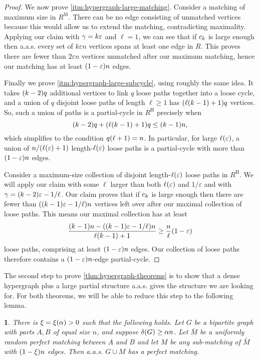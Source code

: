 \documentclass[11pt,english]{article}
\theoremstyle{plain}
\theoremstyle{definition}
\theoremstyle{definition}
\theoremstyle{plain}
\theoremstyle{plain}
\theoremstyle{plain}
\newtheorem{lem}[thm]{\protect\lemmaname}
\theoremstyle{plain}
\theoremstyle{remark}
\theoremstyle{remark}
\let\originalleft\left
\let\originalright\right
\renewcommand{\left}{\mathopen{}\mathclose\bgroup\originalleft}
\renewcommand{\right}{\aftergroup\egroup\originalright}
\providecommand{\lemmaname}{Lemma}
\begin{document}
\begin{proof}
We now prove \ref{itm:hypergraph-large-matching}. Consider a matching of maximum size in $R^{\mathrm{M}}$.
There can be no edge consisting of unmatched vertices because this would
allow us to extend the matching, contradicting maximality. Applying
our claim with $\gamma=k\varepsilon$ and $\ell=1$, we can see that
if $c_{k}$ is large enough then
a.a.s. every set of $k\varepsilon n$ vertices spans at least one
edge in $R$. This proves there are fewer than \emph{$2\varepsilon n$}
vertices unmatched after our maximum matching, hence our matching
has at least $\left(1-\varepsilon\right)n$ edges.

Finally we prove \ref{itm:hypergraph-large-subcycle}, using roughly the same idea. It takes $\left(k-2\right)q$ additional
vertices to link $q$ loose paths together into a loose cycle, and
a union of $q$ disjoint loose paths of length $\ell\ge1$ has $\left(\ell\left(k-1\right)+1\right)q$
vertices. So, such a union of paths is a partial-cycle in $R^{\mathrm{H}}$
precisely when 
\[
\left(k-2\right)q+\left(\ell\left(k-1\right)+1\right)q\le\left(k-1\right)n,
\]
which simplifies to the condition $q\left(\ell+1\right)=n$. In particular,
for large $\ell\left(\varepsilon\right)$, a union of $n/\left(\ell\left(\varepsilon\right)+1\right)$
length-$\ell\left(\varepsilon\right)$ loose paths is a partial-cycle
with more than $\left(1-\varepsilon\right)n$ edges.

Consider a maximum-size collection of disjoint length-$\ell\left(\varepsilon\right)$
loose paths in $R^{\mathrm{H}}$. We will apply our claim with some $\ell$ larger than both $\ell\left(\varepsilon\right)$ and $1/\varepsilon$ and with $\patheps=\left(k-2\right)\varepsilon-1/\ell$. Our claim proves that if $c_{k}$ is large enough then there are fewer than $\left(\left(k-1\right)\varepsilon-1/\ell\right)n$ vertices left over after our maximal collection of loose paths. This means our maximal collection has at least
\[
\frac{\left(k-1\right)n-\left(\left(k-1\right)\varepsilon-1/\ell\right)n}{\ell\left(k-1\right)+1}\ge\frac{n}{\ell}\left(1-\varepsilon\right)
\]
loose paths, comprising at least $\left(1-\varepsilon\right)n$
edges. Our collection of loose paths therefore contains a $\left(1-\varepsilon\right)n$-edge partial-cycle.
\end{proof}
The second step to prove \ref{thm:hypergraph-theorems} is to show that a dense
hypergraph plus a large partial structure a.a.s. gives the structure
we are looking for. For both theorems, we will be able to reduce this
step to the following lemma.
\begin{lem}
\label{lem:bipartite-plus-big-matching-perfect}There is $\xi=\xi\left(\alpha\right)>0$ 
such that the following holds. Let $G$ be a bipartite graph with
parts $A,B$ of equal size $n$, and suppose $\delta\left(G\right)\ge\alpha n$.
Let $\bar{M}$ be a uniformly random perfect matching between $A$
and $B$ and let $M$ be any sub-matching of $\bar{M}$ with $\left(1-\xi\right) n$
edges. Then a.a.s. $G\cup M$ has a perfect matching. 
\end{lem}
\end{document}
